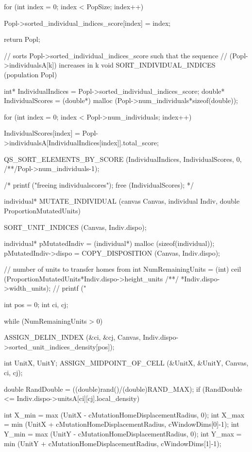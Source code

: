 \begin{C}
{	for (int index = 0; index < PopSize; index++){
		
		Popl->sorted_individual_indices_score[index] = index;
	}
	
	return Popl;
}


// sorts Popl->sorted_individual_indices_score such that the sequence
// (Popl->individualsA[k]) increases in k
void SORT_INDIVIDUAL_INDICES (population Popl){
	
	int* IndividualIndices = Popl->sorted_individual_indices_score;
	double* IndividualScores = (double*) malloc (Popl->num_individuals*sizeof(double));
	
	for (int index = 0; index < Popl->num_individuals; index++){
		
		IndividualScores[index] = Popl->individualsA[IndividualIndices[index]].total_score;
	}
	
	QS_SORT_ELEMENTS_BY_SCORE (IndividualIndices, IndividualScores, 0,
	/**/Popl->num_individuals-1);
	
	/* printf ("freeing individualscores\n");
	free (IndividualScores); */
}

individual* MUTATE_INDIVIDUAL (canvas Canvas, individual Indiv, double ProportionMutatedUnits){
	
	SORT_UNIT_INDICES (Canvas, Indiv.dispo);
	
	individual* pMutatedIndiv = (individual*) malloc (sizeof(individual));
	pMutatedIndiv->dispo = COPY_DISPOSITION (Canvas, Indiv.dispo);
	
	// number of units to transfer homes from
	int NumRemainingUnits = (int) ceil (ProportionMutatedUnits*Indiv.dispo->height_units
	/**/ *Indiv.dispo->width_units);
	// printf ("%
	
	int pos = 0;
	int ci, cj;
	
	while (NumRemainingUnits > 0){
		
		ASSIGN_DELIN_INDEX (&ci, &cj, Canvas, Indiv.dispo->sorted_unit_indices_density[pos]);
		
		int UnitX, UnitY;
		ASSIGN_MIDPOINT_OF_CELL (&UnitX, &UnitY, Canvas, ci, cj);
		
		double RandDouble = ((double)rand()/(double)RAND_MAX);
		if (RandDouble <= Indiv.dispo->unitsA[ci][cj].local_density){
			
			int X_min = max (UnitX - cMutationHomeDisplacementRadius, 0);
			int X_max = min (UnitX + cMutationHomeDisplacementRadius, cWindowDims[0]-1);
			int Y_min = max (UnitY - cMutationHomeDisplacementRadius, 0);
			int Y_max = min (UnitY + cMutationHomeDisplacementRadius, cWindowDims[1]-1);
			
}}}
\end{C}

